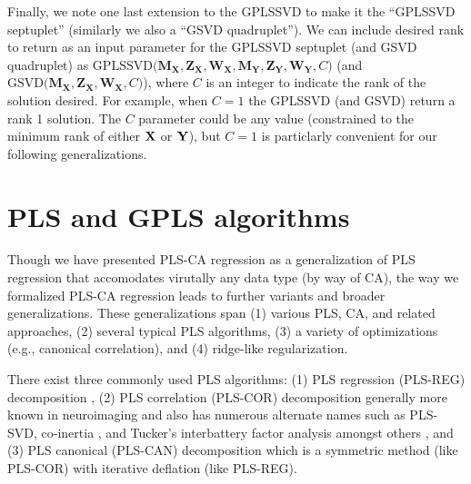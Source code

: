 \documentclass[12pt]{article}
\begin{document}
Finally, we note one last extension to the GPLSSVD to make it the
``GPLSSVD septuplet'' (similarly we also a ``GSVD quadruplet''). We can
include desired rank to return as an input parameter for the GPLSSVD
septuplet (and GSVD quadruplet) as
\(\mathrm{GPLSSVD(} {\mathbf M}_{\mathbf X}, {\mathbf Z}_{\mathbf X}, {\mathbf W}_{\mathbf X}, {\mathbf M}_{\mathbf Y}, {\mathbf Z}_{\mathbf Y}, {\mathbf W}_{\mathbf Y}, C \mathrm{)}\)
(and
\(\mathrm{GSVD(} {\mathbf M}_{\mathbf X}, {\mathbf Z}_{\mathbf X}, {\mathbf W}_{\mathbf X}, C \mathrm{)}\)),
where \(C\) is an integer to indicate the rank of the solution desired.
For example, when \(C = 1\) the GPLSSVD (and GSVD) return a rank 1
solution. The \(C\) parameter could be any value (constrained to the
minimum rank of either \({\bf X}\) or \({\bf Y}\)), but \(C=1\) is
particlarly convenient for our following generalizations.

\hypertarget{pls-and-gpls-algorithms}{%
\section{PLS and GPLS algorithms}\label{pls-and-gpls-algorithms}}

Though we have presented PLS-CA regression as a generalization of PLS
regression that accomodates virutally any data type (by way of CA), the
way we formalized PLS-CA regression leads to further variants and
broader generalizations. These generalizations span (1) various PLS, CA,
and related approaches, (2) several typical PLS algorithms, (3) a
variety of optimizations (e.g., canonical correlation), and (4)
ridge-like regularization.

There exist three commonly used PLS algorithms: (1) PLS regression
(PLS-REG) decomposition
\citep{wold1975soft, wold_collinearity_1984, wold_pls-regression_2001, abdi_partial_2010-1},
(2) PLS correlation (PLS-COR) decomposition
\citep{bookstein1994partial, ketterlinus1989partial} generally more
known in neuroimaging
\citep{mcintosh_spatial_1996, mcintosh_partial_2004, krishnan_partial_2011}
and also has numerous alternate names such as PLS-SVD, co-inertia
\citep[\citet{dray2014}]{doledec1994}, and Tucker's interbattery factor
analysis \citep{tucker_inter-battery_1958} amongst others \citep[see
also][]{beaton_partial_2016}, and (3) PLS canonical (PLS-CAN)
decomposition \citep{tenenhaus_regression_1998, wegelin2000survey} which
is a symmetric method (like PLS-COR) with iterative deflation (like
PLS-REG).
\end{document}
